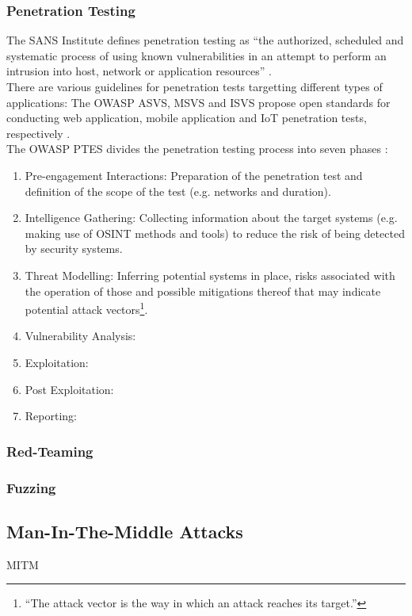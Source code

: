 \subsubsection{Penetration Testing}
The SANS Institute defines penetration testing as \enquote{the authorized, scheduled and systematic process of using known vulnerabilities in an attempt to perform an intrusion into host, network or application resources} \cite{braden_2002}.\\
There are various guidelines for penetration tests targetting different types of applications: The \ac{OWASP} \ac{ASVS}, \ac{MSVS} and \ac{ISVS} propose open standards for conducting web application, mobile application and \ac{IoT} penetration tests, respectively \cite{owaspasvs}\cite{owaspmsvs}\cite{owaspisvs}.\\
The \ac{OWASP} \ac{PTES} divides the penetration testing process into seven phases \cite{owaspptes}:
\begin{enumerate}
    \item Pre-engagement Interactions: Preparation of the penetration test and definition of the scope of the test (e.g. networks and duration).
    \item Intelligence Gathering: Collecting information about the target systems (e.g. making use of \ac{OSINT} methods and tools) to reduce the risk of being detected by security systems.
    \item Threat Modelling: Inferring potential systems in place, risks associated with the operation of those and possible mitigations thereof that may indicate potential attack vectors\footnote{\enquote{The attack vector is the way in which an attack reaches its target.}\cite{HANSMAN200531}}.
    \item Vulnerability Analysis:
    \item Exploitation:
    \item Post Exploitation:
    \item Reporting:
\end{enumerate}

\subsubsection{Red-Teaming}
\subsubsection{Fuzzing}

\subsection{Man-In-The-Middle Attacks}
\ac{MITM}

